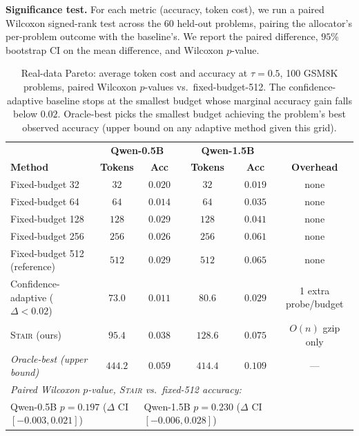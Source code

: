 \documentclass{article}
\newcommand{\method}{\textsc{Stair}}
\begin{document}
\textbf{Significance test.}  For each metric (accuracy, token cost), we run a paired Wilcoxon signed-rank test across the $60$ held-out problems, pairing the allocator's per-problem outcome with the baseline's.  We report the paired difference, $95\%$ bootstrap CI on the mean difference, and Wilcoxon $p$-value.

\begin{table}[h]
\centering
\caption{Real-data Pareto: average token cost and accuracy at $\tau{=}0.5$, 100 GSM8K problems, paired Wilcoxon $p$-values vs.\ fixed-budget-512.  The confidence-adaptive baseline stops at the smallest budget whose marginal accuracy gain falls below $0.02$.  Oracle-best picks the smallest budget achieving the problem's best observed accuracy (upper bound on any adaptive method given this grid).}
\label{tab:real_pareto}
\small
\begin{tabular}{lccccc}
\toprule
 & \multicolumn{2}{c}{\textbf{Qwen-0.5B}} & \multicolumn{2}{c}{\textbf{Qwen-1.5B}} & \\
\textbf{Method} & \textbf{Tokens} & \textbf{Acc} & \textbf{Tokens} & \textbf{Acc} & \textbf{Overhead} \\
\midrule
Fixed-budget 32                & $32$  & $0.020$ & $32$  & $0.019$ & none          \\
Fixed-budget 64                & $64$  & $0.014$ & $64$  & $0.035$ & none          \\
Fixed-budget 128               & $128$ & $0.029$ & $128$ & $0.041$ & none          \\
Fixed-budget 256               & $256$ & $0.026$ & $256$ & $0.061$ & none          \\
Fixed-budget 512 (reference)   & $512$ & $0.029$ & $512$ & $0.065$ & none          \\
Confidence-adaptive ($\Delta{<}0.02$) & $73.0$ & $0.011$ & $80.6$ & $0.029$ & 1 extra probe/budget \\
\method{} (ours)              & $\bm{95.4}$ & $\bm{0.038}$ & $\bm{128.6}$ & $\bm{0.075}$ & $O(n)$ gzip only \\
\midrule
\textit{Oracle-best (upper bound)} & $444.2$ & $0.059$ & $414.4$ & $0.109$ & --- \\
\midrule
\multicolumn{6}{l}{\textit{Paired Wilcoxon $p$-value, \method{} vs.\ fixed-512 accuracy:}} \\
\multicolumn{2}{l}{Qwen-0.5B $p{=}0.197$ ($\Delta$ CI $[-0.003, 0.021]$)} &
\multicolumn{3}{l}{Qwen-1.5B $p{=}0.230$ ($\Delta$ CI $[-0.006, 0.028]$)} & \\
\bottomrule
\end{tabular}
\end{table}
\end{document}
